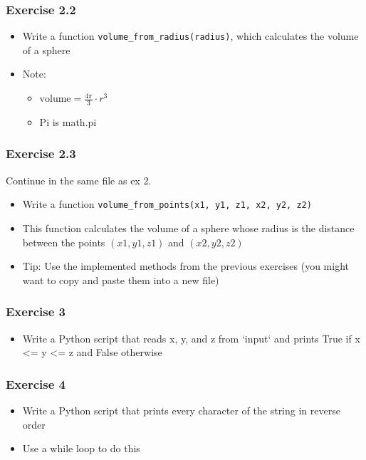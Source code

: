 \documentclass[10pt, a4paper]{beamer} %
\begin{document}
{\begin{frame}[c, fragile]\frametitle{Exercise 2.2}
	\begin{itemize}
		\item Write a function \texttt{volume\_from\_radius(radius)}, which calculates the
		      volume of a sphere
		\item Note:
		      \begin{itemize}
			      \item \( \text{volume} = \frac{4\pi}{3}\cdot r^3\)
			      \item Pi is math.pi
		      \end{itemize}
	\end{itemize}

\end{frame}


\begin{frame}[c, fragile]\frametitle{Exercise 2.3}
	Continue in the same file as ex 2.
	\begin{itemize}
		\item Write a function \texttt{volume\_from\_points(x1, y1, z1, x2, y2, z2)}
		\item This function calculates the volume of a sphere whose radius is the distance between the points $(x1, y1, z1)$ and $(x2, y2, z2)$
		\item Tip: Use the implemented methods from the previous exercises (you might want to copy and paste them into a new file)
	\end{itemize}

\end{frame}

\begin{frame}[c, fragile]\frametitle{Exercise 3}
	\begin{itemize}
		\item Write a Python script that reads x, y, and z from `input` and prints True if x <= y <=
		      z and False otherwise
	\end{itemize}

\end{frame}

\begin{frame}[c, fragile]\frametitle{Exercise 4}

	\begin{itemize}
		\item Write a Python script that prints every character of the string in reverse order
		\item Use a while loop to do this
	\end{itemize}
\end{frame}

}
\end{document}
